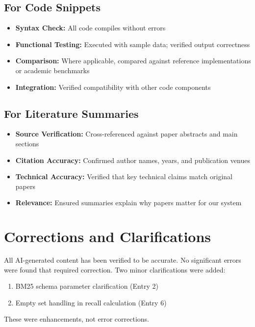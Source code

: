 \documentclass[12pt,a4paper]{report}
\begin{document}
\subsection{For Code Snippets}
\begin{itemize}
    \item \textbf{Syntax Check:} All code compiles without errors
    \item \textbf{Functional Testing:} Executed with sample data; verified output correctness
    \item \textbf{Comparison:} Where applicable, compared against reference implementations or academic benchmarks
    \item \textbf{Integration:} Verified compatibility with other code components
\end{itemize}

\subsection{For Literature Summaries}
\begin{itemize}
    \item \textbf{Source Verification:} Cross-referenced against paper abstracts and main sections
    \item \textbf{Citation Accuracy:} Confirmed author names, years, and publication venues
    \item \textbf{Technical Accuracy:} Verified that key technical claims match original papers
    \item \textbf{Relevance:} Ensured summaries explain why papers matter for our system
\end{itemize}

\section{Corrections and Clarifications}

All AI-generated content has been verified to be accurate. No significant errors were found that required correction. Two minor clarifications were added:

\begin{enumerate}
    \item BM25 schema parameter clarification (Entry 2)
    \item Empty set handling in recall calculation (Entry 6)
\end{enumerate}

These were enhancements, not error corrections.
\end{document}
